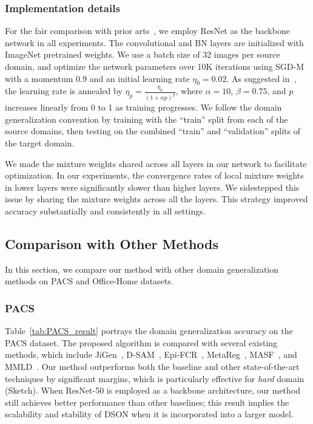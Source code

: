 \documentclass[runningheads]{llncs}
\begin{document}
\subsubsection{Implementation details}
For the fair comparison with prior arts~\cite{balaji2018metareg,dinnocente2018domain,li2017domain,li2019episodic}, we employ ResNet as the backbone network in all experiments. 
The convolutional and BN layers are initialized with ImageNet pretrained weights. 
We use a batch size of 32 images per source domain, and optimize the network parameters over 10K iterations using SGD-M with a momentum 0.9 and an initial learning rate $\eta_0 = 0.02$. 
As suggested in~\cite{zhao2018adversarial}, the learning rate is annealed by $\eta_p = \frac{\eta_0}{(1+\alpha p)^\beta}$, where $\alpha = 10$, $\beta = 0.75$, and $p$ increases linearly from 0 to 1 as training progresses. We follow the domain generalization convention by training with the ``train'' split from each of the source domains, then testing on the combined ``train'' and ``validation'' splits of the target domain. 


We made the mixture weights shared across all layers in our network to facilitate optimization.
In our experiments, the convergence rates of local mixture weights in lower layers were significantly slower than higher layers.
We sidestepped this issue by sharing the mixture weights across all the layers.
This strategy improved accuracy substantially and consistently in all settings.

\subsection{Comparison with Other Methods}

In this section, we compare our method with other domain generalization methods on PACS and Office-Home datasets.

\subsubsection{PACS}
Table~\ref{tab:PACS_result} portrays the domain generalization accuracy on the PACS dataset. 
The proposed algorithm is compared with several existing methods, which include JiGen~\cite{li2017domain}, D-SAM~\cite{dinnocente2018domain}, Epi-FCR~\cite{li2019episodic}, MetaReg~\cite{balaji2018metareg}, MASF~\cite{dou2019domain}, and MMLD~\cite{matsuura2020domain}.
Our method outperforms both the baseline and other state-of-the-art techniques by significant margins, which is particularly effective for {\it hard} domain (Sketch).
When ResNet-50 is employed as a backbone architecture, our method still achieves better performance than other baselines; this result  implies the scalability and stability of DSON when it is incorporated into a larger model.
\end{document}
